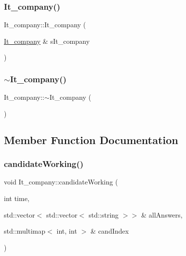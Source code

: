 \hypertarget{class_it__company_adbd662e9e7bc67642283301274a9326b}{}\label{class_it__company_adbd662e9e7bc67642283301274a9326b} 
\subsubsection{\texorpdfstring{It\+\_\+company()}{It\_company()}\hspace{0.1cm}{\footnotesize\ttfamily [3/3]}}
{\footnotesize\ttfamily It\+\_\+company\+::\+It\+\_\+company (\begin{DoxyParamCaption}\item[{\hyperlink{class_it__company}{It\+\_\+company} \&}]{s\+It\+\_\+company }\end{DoxyParamCaption})\hspace{0.3cm}{\ttfamily [inline]}}

\hypertarget{class_it__company_abea4fe4b9e6229c4b7e84881cf124975}{}\label{class_it__company_abea4fe4b9e6229c4b7e84881cf124975} 
\subsubsection{\texorpdfstring{$\sim$\+It\+\_\+company()}{~It\_company()}}
{\footnotesize\ttfamily It\+\_\+company\+::$\sim$\+It\+\_\+company (\begin{DoxyParamCaption}{ }\end{DoxyParamCaption})\hspace{0.3cm}{\ttfamily [inline]}}



\subsection{Member Function Documentation}
\hypertarget{class_it__company_aaca00d2170e5b58ec725a35afb0f4b59}{}\label{class_it__company_aaca00d2170e5b58ec725a35afb0f4b59} 
\subsubsection{\texorpdfstring{candidate\+Working()}{candidateWorking()}}
{\footnotesize\ttfamily void It\+\_\+company\+::candidate\+Working (\begin{DoxyParamCaption}\item[{int}]{time,  }\item[{std\+::vector$<$ std\+::vector$<$ std\+::string $>$$>$ \&}]{all\+Answers,  }\item[{std\+::multimap$<$ int, int $>$ \&}]{cand\+Index }\end{DoxyParamCaption})\hspace{0.3cm}{\ttfamily [private]}}

